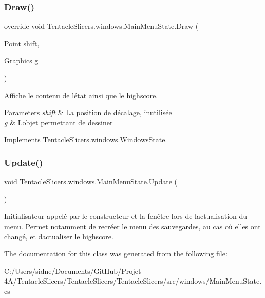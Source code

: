 \subsubsection{\texorpdfstring{Draw()}{Draw()}}
{\footnotesize\ttfamily override void Tentacle\+Slicers.\+windows.\+Main\+Menu\+State.\+Draw (\begin{DoxyParamCaption}\item[{Point}]{shift,  }\item[{Graphics}]{g }\end{DoxyParamCaption})\hspace{0.3cm}{\ttfamily [virtual]}}



Affiche le contenu de l\textquotesingle{}état ainsi que le highscore. 


\begin{DoxyParams}{Parameters}
{\em shift} & La position de décalage, inutilisée \\
\hline
{\em g} & L\textquotesingle{}objet permettant de dessiner \\
\hline
\end{DoxyParams}


Implements \hyperlink{class_tentacle_slicers_1_1windows_1_1_windows_state}{Tentacle\+Slicers.\+windows.\+Windows\+State}.

\mbox{\label{class_tentacle_slicers_1_1windows_1_1_main_menu_state_af3cbcae8c1fb4060c3241fe1d09f055a}} 
\subsubsection{\texorpdfstring{Update()}{Update()}}
{\footnotesize\ttfamily void Tentacle\+Slicers.\+windows.\+Main\+Menu\+State.\+Update (\begin{DoxyParamCaption}{ }\end{DoxyParamCaption})}



Initialisateur appelé par le constructeur et la fenêtre lors de l\textquotesingle{}actualisation du menu. Permet notamment de recréer le menu des sauvegardes, au cas où elles ont changé, et d\textquotesingle{}actualiser le highscore. 



The documentation for this class was generated from the following file\+:\begin{DoxyCompactItemize}
\item 
C\+:/\+Users/sidne/\+Documents/\+Git\+Hub/\+Projet 4\+A/\+Tentacle\+Slicers/\+Tentacle\+Slicers/\+Tentacle\+Slicers/src/windows/Main\+Menu\+State.\+cs\end{DoxyCompactItemize}
